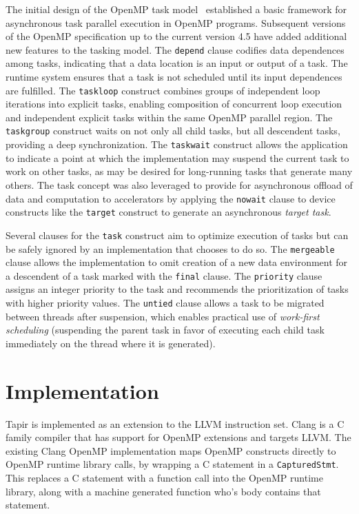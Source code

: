 \documentclass[sigconf]{acmart}
\begin{document}
The initial design of the OpenMP task model~\cite{ayguade09design} established 
a basic framework for asynchronous task parallel execution in OpenMP programs.
Subsequent versions of the OpenMP specification up to the current version 4.5 
have added additional new features to the tasking model.  The \texttt{depend} 
clause codifies data dependences among tasks, indicating that a data location 
is an input or output of a task.  The runtime system ensures that a task is 
not scheduled until its input dependences are fulfilled.  The \texttt{taskloop} 
construct combines groups of independent loop iterations into explicit tasks, 
enabling composition of concurrent loop execution and independent explicit 
tasks within the same OpenMP parallel region. The \texttt{taskgroup} construct 
waits on not only all child tasks, but all descendent tasks, providing a deep 
synchronization. The \texttt{taskwait} construct allows the application to 
indicate a point at which the implementation may suspend the current task to 
work on other tasks, as may be desired for long-running tasks that generate 
many others.  The task concept was also leveraged to provide for asynchronous 
offload of data and computation to accelerators by applying the \texttt{nowait} 
clause to device constructs like the \texttt{target} construct to generate an 
asynchronous \textit{target task}.

Several clauses for the \texttt{task} construct aim to optimize execution of 
tasks but can be safely ignored by an implementation that chooses to do so. 
The \texttt{mergeable} clause allows the implementation to omit creation of a 
new data environment for a descendent of a task marked with the \texttt{final}
clause.  The \texttt{priority} clause assigns an integer priority to the task 
and recommends the prioritization of tasks with higher priority values.
The \texttt{untied} clause allows a task to be migrated between threads after 
suspension, which enables practical use of \textit{work-first scheduling} 
(suspending the parent task in favor of executing each child task immediately 
on the thread where it is generated).

\section{Implementation} \label{Sec:Implementation}

Tapir is implemented as an extension to the LLVM instruction set. Clang is a C
family compiler that has support for OpenMP extensions \cite{clang} and targets
LLVM. The existing Clang OpenMP implementation maps OpenMP constructs directly
to OpenMP runtime library calls, by wrapping a C statement in a
\texttt{CapturedStmt}. This replaces a C statement with a function call into
the OpenMP runtime library, along with a machine generated function who's body
contains that statement.   
\end{document}
